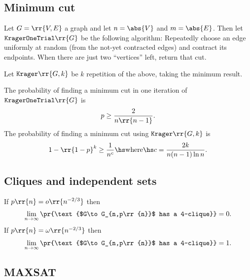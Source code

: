 \documentclass{article}
\begin{document}
\subsection{Minimum cut}

\begin{algorithm}
  \label{alg:krager}
  Let $G= \rr{ V,E }$ a graph and let $n= \abs{ V }$ and $m= \abs{ E }$. Then let
  $\texttt{KragerOneTrial} \rr{ G }$ be the following algorithm: Repeatedly choose an edge
  uniformly at random (from the not-yet contracted edges) and contract its endpoints.
  When there are just two “vertices” left, return that cut.

  Let $ \texttt{Krager} \rr{ G, k }$ be $k$ repetition of the above, taking the minimum
  result.
\end{algorithm}

\begin{theorem}
  \label{thm:krager-probabilities}
  The probability of finding a minimum cut in one iteration of $ \texttt{KragerOneTrial} \rr{ G }$
  is
  \begin{align*}
    p \geq \frac{2}{n \rr{ n-1 }}.
  \end{align*}
  The probability of finding a minimum cut using $ \texttt{Krager} \rr{ G,k }$ is
  \begin{align*}
    1-\rr{ 1-p }^k \geq \frac{1}{n^c} \hs \text{where} \hs c = \frac{2k}{n(n-1)\ln n}.
  \end{align*}
\end{theorem}

\subsection{Cliques and independent sets}

\begin{theorem}
  If $p\rr{n}=o\rr{n^{-2/3}}$ then
  \begin{align*}
    \lim_{n\to\infty} \pr{\text{$G\to G_{n,p\rr{n}}$ has a 4-clique}}=0.
  \end{align*}
  If $p\rr{n}=\omega\rr{n^{-2/3}}$ then
  \begin{align*}
    \lim_{n\to\infty} \pr{\text{$G\to G_{n,p\rr{n}}$ has a 4-clique}}=1.
  \end{align*}
\end{theorem}

\subsection{MAXSAT}\label{sec:maxsat}
\end{document}
